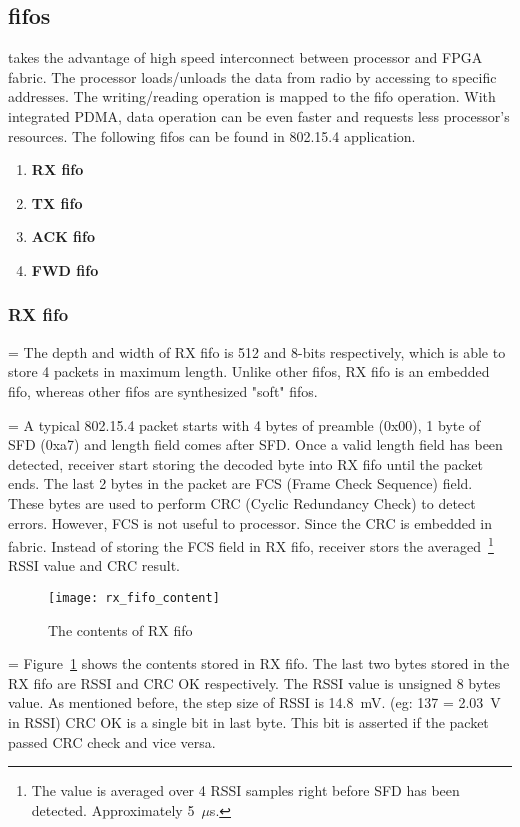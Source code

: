 \clearpage
\subsection{fifos}
\sdr takes the advantage of high speed interconnect between processor and FPGA fabric. The processor
loads/unloads the data from radio by accessing to specific addresses. The writing/reading 
operation is mapped to the fifo operation. With integrated PDMA, data operation can be even
faster and requests less processor's resources.
The following fifos can be found in 802.15.4 application.
\begin{enumerate}
	\item {\bf RX fifo}
	\item {\bf TX fifo}
	\item {\bf ACK fifo}
	\item {\bf FWD fifo}
\end{enumerate}

\subsubsection{RX fifo}
\hangindent=\parindent
{}
The depth and width of RX fifo is 512 and 8-bits respectively, which is able to store 4 packets
in maximum length. Unlike other fifos, RX fifo is an embedded fifo, whereas other fifos are
synthesized "soft" fifos.

\hangindent=\parindent
{}
A typical 802.15.4 packet starts with 4 bytes of preamble (0x00), 1 byte of SFD (0xa7) and length
field comes after SFD. Once a valid length field has been detected, receiver start storing the
decoded byte into RX fifo until the packet ends. The last 2 bytes in the packet are FCS (Frame 
Check Sequence) field. These bytes are used to perform CRC (Cyclic Redundancy Check) to detect
errors. However, FCS is not useful to processor. Since the CRC is embedded in fabric. Instead of
storing the FCS field in RX fifo, receiver stors the averaged~\footnote{The value is averaged 
over 4 RSSI samples right before SFD has been detected. Approximately 5~$\mu$s.}
RSSI value and CRC result. 
\begin{figure}[h]
	\centering
	\texttt{[image: rx\_fifo\_content]}
	\caption{The contents of RX fifo}
	\label{fig:rx_fifo_content}
\end{figure}


\hangindent=\parindent
{}
Figure~\ref{fig:rx_fifo_content} shows the contents stored in RX fifo. The last two bytes
stored in the RX fifo are RSSI and CRC OK respectively. The RSSI value is unsigned 8 bytes
value. As mentioned before, the step size of RSSI is 14.8~mV. (eg: 137 = 2.03~V in RSSI)
CRC OK is a single bit in last byte. This bit is asserted if the packet passed CRC check
and vice versa.

